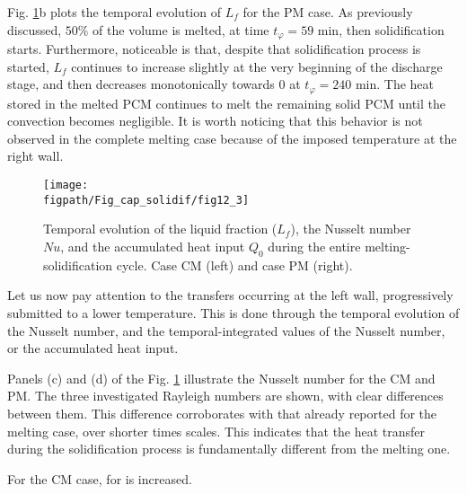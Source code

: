 Fig. \ref{fig:Lf_full_1D_profil}b plots the temporal evolution of $L_f$ for the PM case. 
As previously discussed, $50\%$ of the volume is melted, at time $t_{\varphi} = 59$ min, then solidification starts. 
Furthermore, noticeable is that, despite that solidification process is started, $L_f$ continues to increase slightly at the very beginning of the discharge stage, and then decreases monotonically towards $0$ at $t_{\varphi} = 240$ min.
The heat stored in the melted PCM continues to melt the remaining solid PCM until the convection becomes negligible.
It is worth noticing that this behavior is not observed in the complete melting case because of the imposed temperature at the right wall.  


\begin{figure}
\begin{center}
\begin{minipage}[t]{0.9\textwidth}
	\texttt{[image: \\figpath/Fig\_cap\_solidif/fig12\_3]}
\end{minipage}
\end{center}
\caption{Temporal evolution of the  liquid fraction ($L_f$), the Nusselt number $N\!u$, and the accumulated heat input $Q_0$ during the entire melting-solidification cycle. Case CM  (left) and  case PM  (right).}\label{fig:Lf_full_1D_profil}
\end{figure}

Let us now pay attention to the transfers occurring at the left wall, progressively submitted to a lower temperature. 
This is done through the temporal evolution of the Nusselt number,  and the temporal-integrated values of the Nusselt number, or the accumulated heat input.     

Panels (c) and (d) of the Fig. \ref{fig:Lf_full_1D_profil} illustrate the Nusselt number for the CM and PM.  
The three investigated Rayleigh numbers are shown, with clear differences between them. This difference corroborates with that already reported for the melting case, over shorter times scales.   This indicates that the heat transfer during the solidification process is fundamentally different from the melting one.

For the CM case, for   is increased.

